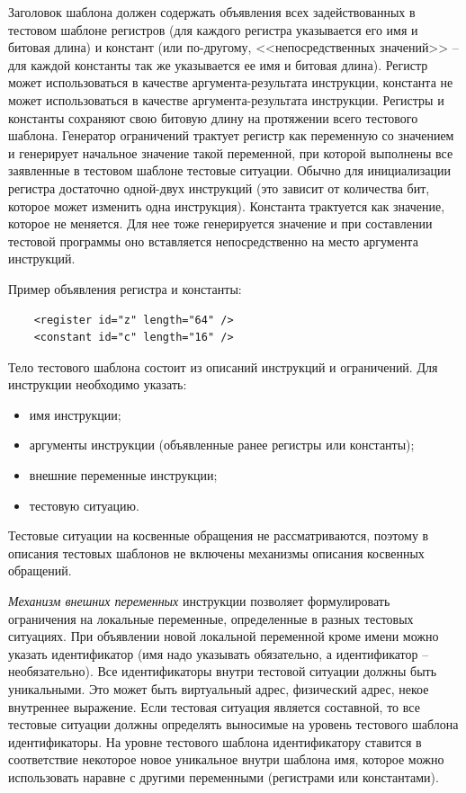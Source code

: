 Заголовок шаблона должен содержать объявления всех задействованных в
тестовом шаблоне регистров (для каждого регистра указывается его имя
и битовая длина) и констант (или по-другому, <<непосредственных
значений>> -- для каждой константы так же указывается ее имя и
битовая длина). Регистр может использоваться в качестве
аргумента-результата инструкции, константа не может использоваться в
качестве аргумента-результата инструкции. Регистры и константы
сохраняют свою битовую длину на протяжении всего тестового шаблона.
Генератор ограничений трактует регистр как переменную со значением и
генерирует начальное значение такой переменной, при которой
выполнены все заявленные в тестовом шаблоне тестовые ситуации.
Обычно для инициализации регистра достаточно одной-двух инструкций
(это зависит от количества бит, которое может изменить одна
инструкция). Константа трактуется как значение, которое не меняется.
Для нее тоже генерируется значение и при составлении тестовой
программы оно вставляется непосредственно на место аргумента
инструкций.

Пример объявления регистра и константы: {\small \begin{verbatim}
    <register id="z" length="64" />
    <constant id="c" length="16" />
\end{verbatim}}

Тело тестового шаблона состоит из описаний инструкций и ограничений.
Для инструкции необходимо указать:
\begin{itemize}
\item имя инструкции;
\item аргументы инструкции (объявленные ранее регистры или
константы);
\item внешние переменные инструкции;
\item тестовую ситуацию.
\end{itemize}

Тестовые ситуации на косвенные обращения не рассматриваются, поэтому
в описания тестовых шаблонов не включены механизмы описания
косвенных обращений.

\emph{Механизм внешних переменных} инструкции позволяет
формулировать ограничения на локальные переменные, определенные в
разных тестовых ситуациях. При объявлении новой локальной переменной
кроме имени можно указать идентификатор (имя надо указывать
обязательно, а идентификатор -- необязательно). Все идентификаторы
внутри тестовой ситуации должны быть уникальными. Это может быть
виртуальный адрес, физический адрес, некое внутреннее выражение.
Если тестовая ситуация является составной, то все тестовые ситуации
должны определять выносимые на уровень тестового шаблона
идентификаторы. На уровне тестового шаблона идентификатору ставится
в соответствие некоторое новое уникальное внутри шаблона имя,
которое можно использовать наравне с другими переменными (регистрами
или константами).

